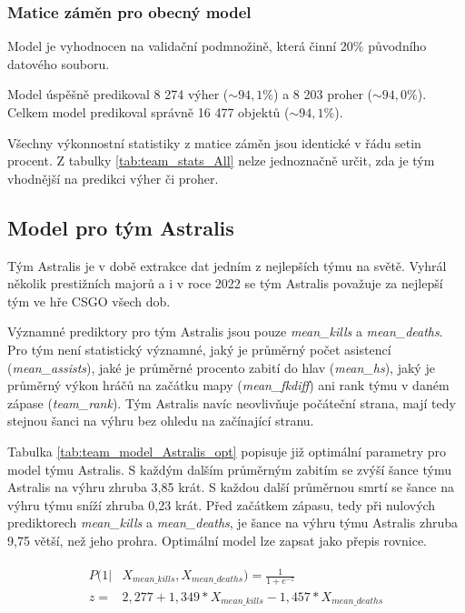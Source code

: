 \subsubsection{Matice záměn pro obecný model}
Model je vyhodnocen na validační podmnožině, která činní 20\% původního datového souboru.



Model úspěšně predikoval 8 274 výher ($\sim 94,1\%$) a 8 203 proher ($\sim 94,0\%$). Celkem model predikoval správně 16 477 objektů ($\sim 94,1\%$).



Všechny výkonnostní statistiky z matice záměn jsou identické v řádu setin procent. Z tabulky \ref{tab:team_stats_All} nelze jednoznačně určit, zda je tým
vhodnější na predikci výher či proher.

\subsection{Model pro tým Astralis}
Tým Astralis je v době extrakce dat jedním z nejlepších týmu na světě. Vyhrál několik prestižních majorů a i v roce 2022 se tým Astralis považuje za nejlepší tým
ve hře \ac{CSGO} všech dob.



Významné prediktory pro tým Astralis jsou pouze \textit{mean\_kills} a \textit{mean\_deaths}.  Pro tým není statistický významné, jaký je průměrný počet asistencí
(\textit{mean\_assists}), jaké je průměrné procento zabití do hlav (\textit{mean\_hs}), jaký je průměrný výkon hráčů na začátku mapy (\textit{mean\_fkdiff}) ani 
rank týmu v daném zápase (\textit{team\_rank}). Tým Astralis navíc neovlivňuje počáteční strana, mají tedy stejnou šanci na výhru bez ohledu na 
začínající stranu.



Tabulka \ref{tab:team_model_Astralis_opt} popisuje již optimální parametry pro model týmu Astralis. S každým dalším průměrným zabitím se zvýší šance
týmu Astralis na výhru zhruba 3,85 krát. S každou další průměrnou smrtí se šance na výhru týmu sníží zhruba 0,23 krát. 
Před začátkem zápasu, tedy při nulových prediktorech \textit{mean\_kills} a \textit{mean\_deaths}, je šance na výhru týmu Astralis zhruba 9,75 větší, než jeho
prohra. Optimální model lze zapsat jako přepis rovnice.

\begin{align}
    \begin{split}
        P(1 | &X_{mean\_kills},  X_{mean\_deaths}) = \frac{1}{1 + e^{-z}} \\
        z = &2,277 + 1,349*X_{mean\_kills} - 1,457*X_{mean\_deaths}
    \end{split}
\end{align}

